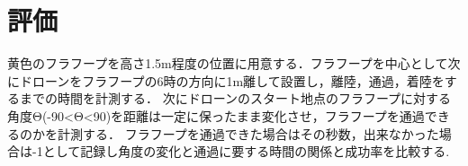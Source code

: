 \section{評価}
黄色のフラフープを高さ1.5m程度の位置に用意する．フラフープを中心として次にドローンをフラフープの6時の方向に1m離して設置し，離陸，通過，着陸をするまでの時間を計測する．
次にドローンのスタート地点のフラフープに対する角度Θ(-90<Θ<90)を距離は一定に保ったまま変化させ，フラフープを通過できるのかを計測する．
フラフープを通過できた場合はその秒数，出来なかった場合は-1として記録し角度の変化と通過に要する時間の関係と成功率を比較する.
